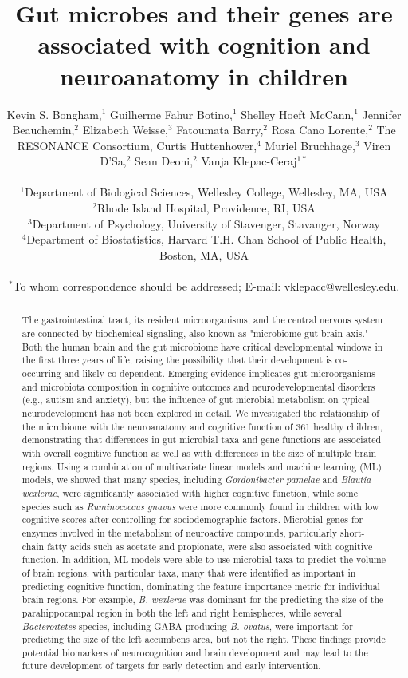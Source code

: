 \documentclass{article}
\title{Gut microbes and their genes are associated with cognition and neuroanatomy in children}
\author{%
    \parbox{\linewidth}{\centering
        Kevin S. Bongham,$^{1}$
        Guilherme Fahur Botino,$^{1}$
        Shelley Hoeft McCann,$^{1}$
        Jennifer Beauchemin,$^{2}$
        Elizabeth Weisse,$^{3}$
        Fatoumata Barry,$^{2}$
        Rosa Cano Lorente,$^{2}$
        The RESONANCE Consortium,
        Curtis Huttenhower,$^{4}$
        Muriel Bruchhage,$^{3}$
        Viren D'Sa,$^{2}$
        Sean Deoni,$^{2}$
        Vanja Klepac-Ceraj$^{1\ast}$
    }
\\
\normalsize{$^{1}$Department of Biological Sciences, Wellesley College, Wellesley, MA, USA}\\
\normalsize{$^{2}$Rhode Island Hospital, Providence, RI, USA}\\
\normalsize{$^{3}$Department of Psychology, University of Stavenger, Stavanger, Norway}\\
\normalsize{$^{4}$Department of Biostatistics, Harvard T.H. Chan School of Public Health, Boston, MA, USA}\\
\\
\normalsize{$^\ast$To whom correspondence should be addressed; E-mail:  vklepacc@wellesley.edu.}
}
\date{}
\begin{document}
\baselineskip24pt

\maketitle 

\begin{abstract}
The gastrointestinal tract, its resident microorganisms, and the central
nervous system are connected by biochemical signaling, also known as
"microbiome-gut-brain-axis." Both the human brain and the gut microbiome
have critical developmental windows in the first three years of life,
raising the possibility that their development is co-occurring and
likely co-dependent. Emerging evidence implicates gut microorganisms and
microbiota composition in cognitive outcomes and neurodevelopmental
disorders (e.g., autism and anxiety), but the influence of gut microbial
metabolism on typical neurodevelopment has not been explored in detail.
We investigated the relationship of the microbiome with the neuroanatomy
and cognitive function of 361 healthy children, demonstrating that
differences in gut microbial taxa and gene functions are associated with
overall cognitive function as well as with differences in the size of
multiple brain regions.
Using a combination of multivariate linear
models and machine learning (ML) models, we showed that many species,
including \emph{Gordonibacter pamelae} and \emph{Blautia wexlerae}, were
significantly associated with higher cognitive function, while some
species such as \emph{Ruminococcus gnavus} were more commonly found in
children with low cognitive scores after controlling for sociodemographic factors.
Microbial genes for enzymes involved in the metabolism of
neuroactive compounds, particularly short-chain fatty acids such as
acetate and propionate, were also associated with cognitive function.
In addition, ML models were able to use microbial taxa to predict the
volume of brain regions, with particular taxa, many that were identified
as important in predicting cognitive function, dominating the
feature importance metric for individual brain regions. For example, \emph{B.
wexlerae} was dominant for the predicting the size of the parahippocampal region
in both the left and right hemispheres, while several \textit{Bacteroitetes} species,
including GABA-producing \emph{B. ovatus}, were important for predicting
the size of the left accumbens area, but not the right. These
findings provide potential biomarkers of neurocognition and brain development
and may lead to the future development of targets for early detection and early
intervention.
\end{abstract}
\end{document}
